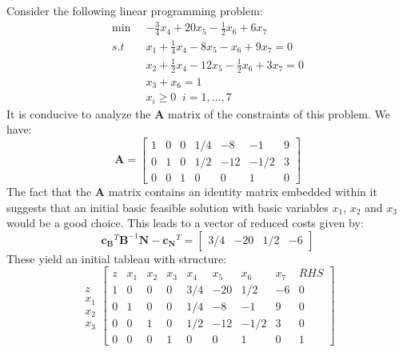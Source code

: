 \begin{example} Consider the following linear programming problem:
\begin{equation}
\begin{aligned}
\min\;\;&-\frac{3}{4}x_4 + 20x_5 -\frac{1}{2}x_6 + 6x_7\\
s.t\;\;&x_1 + \frac{1}{4}x_4 - 8x_5 - x_6 + 9x_7 = 0\\
& x_2 + \frac{1}{2}x_4 - 12x_5 -\frac{1}{2}x_6 + 3x_7 = 0\\
&x_3 + x_6 = 1\\
&x_i \geq 0\;\;i=1,\dots,7
\end{aligned}
\end{equation}
It is conducive to analyze the $\mathbf{A}$ matrix of the constraints of this problem. We have:
\begin{equation}
\mathbf{A} = \begin{bmatrix}
1 & 0 & 0 & 1/4 & -8  & -1   & 9\\
0 & 1 & 0 & 1/2 & -12 & -1/2 & 3\\
0 & 0 & 1 & 0   &  0  & 1    & 0
\end{bmatrix}
\end{equation}
The fact that the $\mathbf{A}$ matrix contains an identity matrix embedded within it suggests that an initial basic feasible solution with basic variables $x_1$, $x_2$ and $x_3$ would be a good choice. This leads to a vector of reduced costs given by:
\begin{equation}
\mathbf{c_B}^T\mathbf{B}^{-1}\mathbf{N}-\mathbf{c_N}^T = 
\begin{bmatrix}3/4 & -20 & 1/2 & -6 \end{bmatrix}
\end{equation}
These yield an initial tableau with structure:
\begin{displaymath}
\begin{array}{c}
\\z\\x_1\\x_2\\x_3
\end{array}\left[
\begin{array}{c|ccccccc|c}
z & x_1 & x_2 & x_3 & x_4 & x_5 & x_6 & x_7 & RHS\\
\hline
1 & 0 & 0 & 0 & 3/4 & -20 & 1/2  & -6 & 0\\
\hline
0 & 1 & 0 & 0 & 1/4 & -8  & -1   & 9  & 0\\
0 & 0 & 1 & 0 & 1/2 & -12 & -1/2 & 3  & 0\\
0 & 0 & 0 & 1 & 0   &  0  & 1    & 0  & 1
\end{array}\right]
\end{displaymath}


\end{example}
